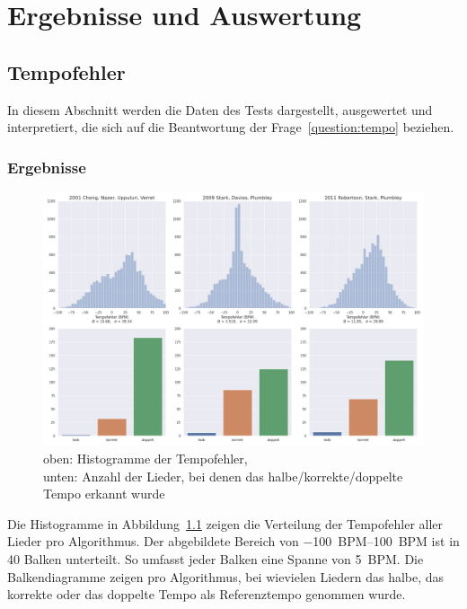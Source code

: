 \chapter{Ergebnisse und Auswertung}
\label{ergebnisse}
\acresetall


\section{Tempofehler}
{
	In diesem Abschnitt werden die Daten des Tests dargestellt, ausgewertet und interpretiert,
		die sich auf die Beantwortung der Frage~\ref{question:tempo} beziehen.

	\subsection{Ergebnisse}
	{
		\begin{figure}[h]
			\hspace{-17mm}
			\includegraphics[scale=0.4]{resources/tempo_error_histogram.png}
			\caption{
				oben: Histogramme der Tempofehler, \\
				unten: Anzahl der Lieder, bei denen das halbe/korrekte/doppelte Tempo erkannt wurde
			}
			\label{fig:tempoerror}
		\end{figure}

		Die Histogramme in Abbildung~\ref{fig:tempoerror} zeigen die Verteilung der Tempofehler aller Lieder pro Algorithmus.
		Der abgebildete Bereich von \SIrange{-100}{100}{\ac{BPM}} ist in \num{40} Balken unterteilt.
		So umfasst jeder Balken eine Spanne von \SI{5}{\ac{BPM}}.
		Die Balkendiagramme zeigen pro Algorithmus,
			bei wievielen Liedern das halbe, das korrekte oder das doppelte Tempo als Referenztempo genommen wurde.

}}
